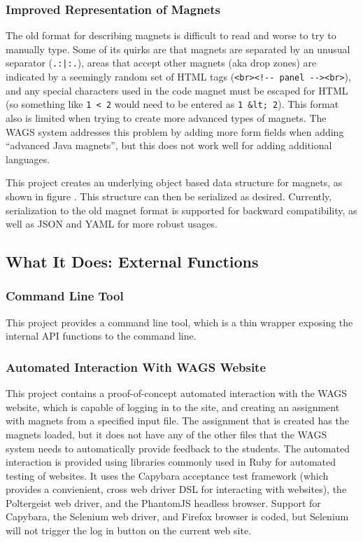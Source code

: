 \documentclass[letter,10pt]{article}
\begin{document}
\subsubsection{Improved Representation of Magnets}

The old format for describing magnets is difficult to read and worse to 
try to manually type. Some of its quirks are that magnets are separated 
by an unusual separator (\verb~.:|:.~), areas that accept other magnets 
(aka drop zones) are indicated by a seemingly random set of HTML tags 
(\verb~<br><!-- panel --><br>~), and any special characters used in the 
code magnet must be escaped for HTML (so something like \verb~1 < 2~ 
would need to be entered as \verb~1 &lt; 2~). This format also is 
limited when trying to create more advanced types of magnets. The WAGS 
system addresses this problem by adding more form fields when adding 
``advanced Java magnets'', but this does not work well for adding 
additional languages.


This project creates an underlying object based data structure for 
magnets, as shown in figure . This 
structure can then be serialized as desired. Currently, serialization to 
the old magnet format is supported for backward compatibility, as well 
as JSON and YAML for more robust usages.



\subsection{What It Does: External Functions}

\subsubsection{Command Line Tool}

This project provides a command line tool, which is a thin wrapper 
exposing the internal API functions to the command line.


\subsubsection{Automated Interaction With WAGS Website}

This project contains a proof-of-concept automated interaction with the 
WAGS website, which is capable of logging in to the site, and creating 
an assignment with magnets from a specified input file. The assignment 
that is created has the magnets loaded, but it does not have any of the 
other files that the WAGS system needs to automatically provide 
feedback to the students. The automated interaction is provided using 
libraries commonly used in Ruby for automated testing of websites. It 
uses the Capybara acceptance test framework (which provides a 
convienient, cross web driver DSL for interacting with websites), the 
Poltergeist web driver, and the PhantomJS headless browser. Support for 
Capybara, the Selenium web driver, and Firefox browser is coded, but 
Selenium will not trigger the log in button on the current web site.
\end{document}
